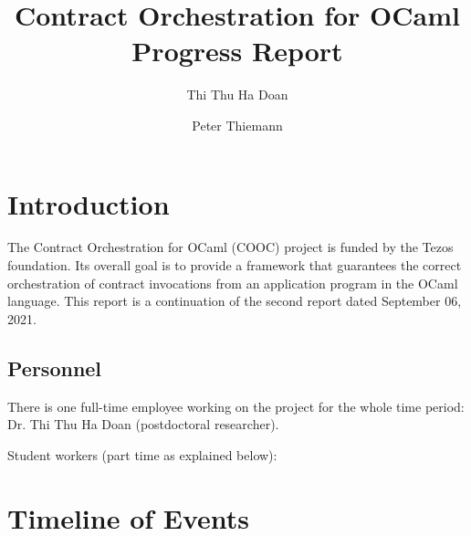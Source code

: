 \documentclass[a4paper,11pt]{article}
\title{Contract Orchestration for OCaml \\
  Progress Report 
}
\author{Thi Thu Ha Doan}
\author{Peter Thiemann}
\affil{University of Freiburg, Germany}
\begin{document}
\maketitle{}

\section{Introduction}
\label{sec:introduction}

The Contract Orchestration for OCaml (COOC) project is funded by the Tezos foundation. Its overall goal  is to provide a framework that guarantees the correct orchestration of contract invocations from an application program in the OCaml language. This report is a continuation of the second report dated September 06, 2021.

\subsection{Personnel}
\label{sec:personnel}

There is one full-time employee working on the project for the whole time period: Dr. Thi Thu Ha Doan (postdoctoral researcher). 

Student workers (part time as explained below): 

\section{Timeline of Events}
\label{sec:timeline-events}
\end{document}
